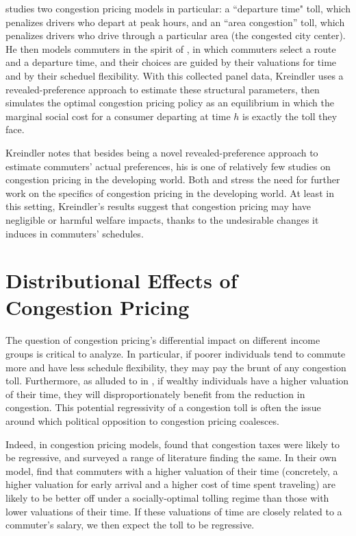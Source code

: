 \documentclass[JEL]{AEA}
\begin{document}
\cite{kreindler-2018} studies two congestion pricing models in particular: a ``departure time" toll, which penalizes drivers who depart at peak hours, and an ``area congestion'' toll, which penalizes drivers who drive through a particular area (the congested city center). He then models commuters in the spirit of \cite{arnott-1994}, in which commuters select a route and a departure time, and their choices are guided by their valuations for time and by their scheduel flexibility. With this collected panel data, Kreindler uses a revealed-preference approach to estimate these structural parameters, then simulates the optimal congestion pricing policy as an equilibrium in which the marginal social cost for a consumer departing at time $h$ is exactly the toll they face.

Kreindler notes that besides being a novel revealed-preference approach to estimate commuters' actual preferences, his is one of relatively few studies on congestion pricing in the developing world. Both \cite{kreindler-2018} and \cite{bryan-2020} stress the need for further work on the specifics of congestion pricing in the developing world. At least in this setting, Kreindler's results suggest that congestion pricing may have negligible or harmful welfare impacts, thanks to the undesirable changes it induces in commuters' schedules.

\section{Distributional Effects of Congestion Pricing}

The question of congestion pricing's differential impact on different income groups is critical to analyze. In particular, if poorer individuals tend to commute more and have less schedule flexibility, they may pay the brunt of any congestion toll. Furthermore, as alluded to in \cite{arnott-1994}, if wealthy individuals have a higher valuation of their time, they will disproportionately benefit from the reduction in congestion. This potential regressivity of a congestion toll is often the issue around which political opposition to congestion pricing coalesces.

Indeed, in congestion pricing models, \cite{arnott-1994} found that congestion taxes were likely to be regressive, and surveyed a range of literature finding the same. In their own model, \cite{arnott-1994} find that commuters with a higher valuation of their time (concretely, a higher valuation for early arrival and a higher cost of time spent traveling) are likely to be better off under a socially-optimal tolling regime than those with lower valuations of their time. If these valuations of time are closely related to a commuter's salary, we then expect the toll to be regressive. 
\end{document}
